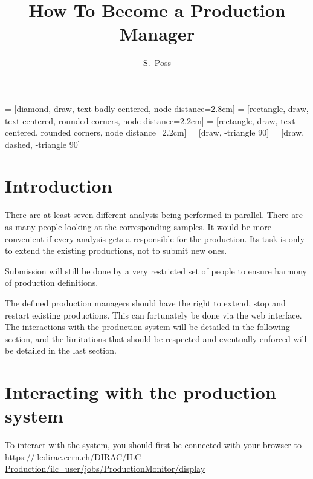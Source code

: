 \documentclass[a4paper,12pt]{article}
\title{How To Become a Production Manager}
\author{S.~Poss}
\begin{document}
 = [diamond, draw, text badly centered, node distance=2.8cm]
 = [rectangle, draw, text centered, rounded corners, node distance=2.2cm]
 = [rectangle, draw, text centered, rounded corners, node distance=2.2cm]
 = [draw, -triangle 90]
 = [draw, dashed, -triangle 90]

\maketitle
{}

\tableofcontents

\section{Introduction}
There are at least seven different analysis being performed in parallel. There
are as many people looking at the corresponding samples. It would be more
convenient if every analysis gets a responsible for the production. Its task is
only to extend the existing productions, not to submit new ones. 

Submission will
still be done by a very restricted set of people to ensure harmony of
production definitions. 

The defined production managers should have the right to extend, stop and
restart existing productions. This can fortunately be done  via the web
interface. The interactions with the production system will be detailed in the
following section, and the limitations that should be respected and eventually
enforced will be detailed in the last section.

\section{Interacting with the production system}
To interact with the system, you should first be connected with your browser
to\\
\url{https://ilcdirac.cern.ch/DIRAC/ILC-Production/ilc\_user/jobs/ProductionMonitor/display}
\end{document}
